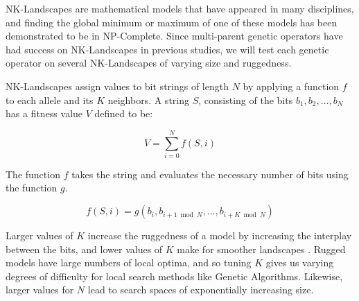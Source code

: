 NK-Landscapes are mathematical models that have appeared in many disciplines, and finding the global minimum or maximum of one of these models has been demonstrated to be in NP-Complete\cite{Weinberger96}. Since multi-parent genetic operators have had success on NK-Landscapes in previous studies, we will test each genetic operator on several NK-Landscapes of varying size and ruggedness\cite{Eiben96,Skellett05}. 

NK-Landscapes assign values to bit strings of length $N$ by applying a function $f$ to each allele and its $K$ neighbors\cite{Kauffman93}. A string $S$, consisting of the bits $b_1,b_2,\ldots,b_N$ has a fitness value $V$ defined to be:

\[ V = \sum\limits_{i = 0}^{N} f(S,i) \]

The function $f$ takes the string and evaluates the necessary number of bits using the function $g$.

\[ f(S,i) = g(b_i, b_{i+1 \bmod{N}}, \ldots, b_{i+K \bmod{N}}) \]

Larger values of $K$ increase the ruggedness of a model by increasing the interplay between the bits, and lower values of $K$ make for smoother landscapes \cite{Kauffman93}. Rugged models have large numbers of local optima, and so tuning $K$ gives us varying degrees of difficulty for local search methods like Genetic Algorithms\cite{Russell10,Skellett05}. Likewise, larger values for $N$ lead to search spaces of exponentially increasing size. 
